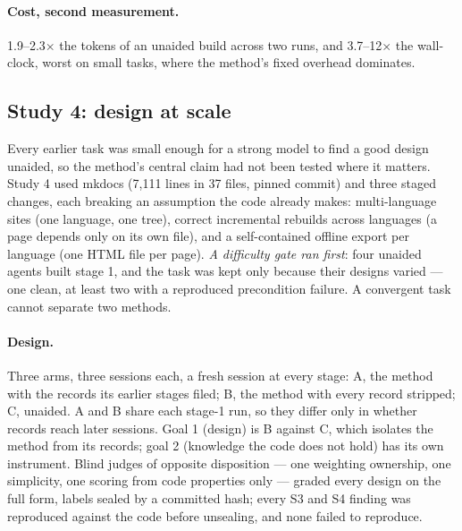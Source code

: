 \documentclass[11pt]{article}
\begin{document}
\paragraph{Cost, second measurement.} 1.9--2.3$\times$ the tokens of an unaided build across two runs, and 3.7--12$\times$ the wall-clock, worst on small tasks, where the method's fixed overhead dominates.

\subsection{Study 4: design at scale}
\label{sec:study4}

Every earlier task was small enough for a strong model to find a good design unaided, so the method's central claim had not been tested where it matters. Study 4 used mkdocs (7,111 lines in 37 files, pinned commit) and three staged changes, each breaking an assumption the code already makes: multi-language sites (one language, one tree), correct incremental rebuilds across languages (a page depends only on its own file), and a self-contained offline export per language (one HTML file per page). \emph{A difficulty gate ran first}: four unaided agents built stage 1, and the task was kept only because their designs varied --- one clean, at least two with a reproduced precondition failure. A convergent task cannot separate two methods.

\paragraph{Design.} Three arms, three sessions each, a fresh session at every stage: A, the method with the records its earlier stages filed; B, the method with every record stripped; C, unaided. A and B share each stage-1 run, so they differ only in whether records reach later sessions. Goal 1 (design) is B against C, which isolates the method from its records; goal 2 (knowledge the code does not hold) has its own instrument. Blind judges of opposite disposition --- one weighting ownership, one simplicity, one scoring from code properties only --- graded every design on the full form, labels sealed by a committed hash; every S3 and S4 finding was reproduced against the code before unsealing, and none failed to reproduce.
\end{document}
